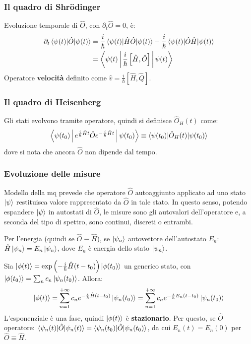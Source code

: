 \documentclass[10pt, a4paper]{scrartcl}
\numberwithin{equation}{subsection}
\theoremstyle{style2}
\theoremstyle{style1}
\begin{document}
\subsubsection{Il quadro di Shr\"odinger}
Evoluzione temporale di $\hat{O}$, con $\partial _t \hat{O}=0$, \`e: 
\begin{equation}
	\begin{split}
		\partial _t  \braket{\psi (t)|\hat{O}|\psi (t)} &= \frac{i}{\hbar }\braket{\psi (t)|\hat{H}\hat{O}|\psi (t)} - \frac{i}{\hbar }\braket{\psi (t)|\hat{O}\hat{H}|\psi (t)} \\
	&= \Braket{\psi (t)|\frac{i}{\hbar }\left[ \hat{H},\hat{O} \right] |\psi (t)} 
	\end{split}
\end{equation}
Operatore \textbf{velocit\`a} definito come $\hat{v}= \frac{i}{\hbar }\left[ \hat{H},\hat{Q} \right] $.

\subsubsection{Il quadro di Heisenberg}

Gli stati evolvono tramite operatore, quindi si definisce $\hat{O}_H (t)$ come:
\begin{equation}
	\Braket{\psi (t_0)|e^{\frac{i}{\hbar }\hat{H}t} \hat{O}e^{-\frac{i}{\hbar }\hat{H}t} |\psi (t_0)} \equiv \braket{\psi (t_0)|\hat{O}_H(t)|\psi (t_0)} 
\end{equation}
dove si nota che ancora $\hat{O}$ non dipende dal tempo.
\subsubsection{Evoluzione delle misure}

Modello della mq prevede che operatore $\hat{O}$ autoaggiunto applicato ad uno stato $\ket{\psi } $ restituisca valore rappresentato da $\hat{O}$ in tale stato. In questo senso, potendo espandere $\ket{\psi } $ in autostati di $\hat{O}$, le misure sono gli autovalori dell'operatore e, a seconda del tipo di spettro, sono continui, discreti o entrambi.

Per l'energia (quindi se $\hat{O}\equiv \hat{H}$), se $\ket{\psi _n} $ autovettore dell'autostato $E_n$: $\hat{H}\ket{\psi _n} = E_n \ket{\psi _n} $, dove $E_n$ \`e energia dello stato $\ket{\psi _n} $. 

Sia $\ket{\phi(t) }  = \exp\left(-\frac{i}{\hbar }\hat{H}(t-t_0)\right) \ket{\phi (t_0)} $ un generico stato, con $\ket{\phi (t_0)} =\sum_{n}^{} c_n \ket{\psi _n(t_0)} $. Allora:
\begin{equation}
	\ket{\phi (t)} = \sum_{n=1}^{+\infty} c_n e^{-\frac{i}{\hbar } \hat{H}(t-t_0)} \ket{\psi _n(t_0)} = \sum_{n=1}^{+\infty} c_n e^{-\frac{i}{\hbar }E_n (t-t_0)} \ket{\psi _n(t_0)}  
\end{equation}
L'esponenziale \`e una fase, quindi $\ket{\phi (t)} $ \`e \textbf{stazionario}. Per questo, se $\hat{O}$ operatore: $\braket{\psi _n(t)|\hat{O}|\psi _n(t)} = \braket{\psi _n(t_0)|\hat{O}|\psi _n(t_0)} $, da cui $E_n(t) = E_n(0)$ per $\hat{O}\equiv \hat{H}$.
\end{document}
